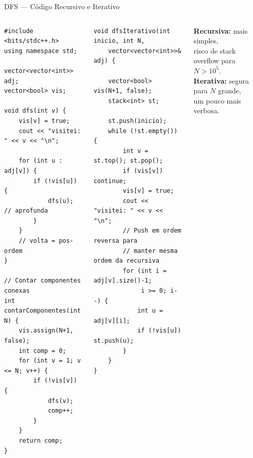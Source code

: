 \documentclass[aspectratio=169,10pt]{beamer}
\begin{document}
\begin{frame}[fragile,shrink=3]{DFS --- Código Recursivo e Iterativo}
  \begin{columns}[t]
      \begin{tcolorbox}[caixaCodigo,title={\small Versão Recursiva (padrão)}]
        \begin{lstlisting}[style=cppsmall]
#include <bits/stdc++.h>
using namespace std;

vector<vector<int>> adj;
vector<bool> vis;

void dfs(int v) {
    vis[v] = true;
    cout << "visitei: " << v << "\n";

    for (int u : adj[v]) {
        if (!vis[u]) {
            dfs(u); // aprofunda
        }
    }
    // volta = pos-ordem
}

// Contar componentes conexas
int contarComponentes(int N) {
    vis.assign(N+1, false);
    int comp = 0;
    for (int v = 1; v <= N; v++) {
        if (!vis[v]) {
            dfs(v);
            comp++;
        }
    }
    return comp;
}
        \end{lstlisting}
      \end{tcolorbox}
      \begin{tcolorbox}[caixaCodigo,title={\small Versão Iterativa (com Stack)}]
        \begin{lstlisting}[style=cppsmall]
void dfsIterativo(int inicio, int N,
    vector<vector<int>>& adj) {

    vector<bool> vis(N+1, false);
    stack<int> st;

    st.push(inicio);
    while (!st.empty()) {
        int v = st.top(); st.pop();
        if (vis[v]) continue;
        vis[v] = true;
        cout << "visitei: " << v << "\n";
        // Push em ordem reversa para
        // manter mesma ordem da recursiva
        for (int i = adj[v].size()-1;
             i >= 0; i--) {
            int u = adj[v][i];
            if (!vis[u]) st.push(u);
        }
    }
}
        \end{lstlisting}
      \end{tcolorbox}
      \begin{tcolorbox}[caixaAmarelo,title={Recursiva vs Iterativa}]
        \footnotesize
        \textbf{Recursiva:} mais simples, \\
        risco de stack overflow para $N > 10^5$.\\[3pt]
        \textbf{Iterativa:} segura para $N$ grande,\\
        um pouco mais verbosa.
      \end{tcolorbox}
  \end{columns}
\end{frame}
\end{document}
